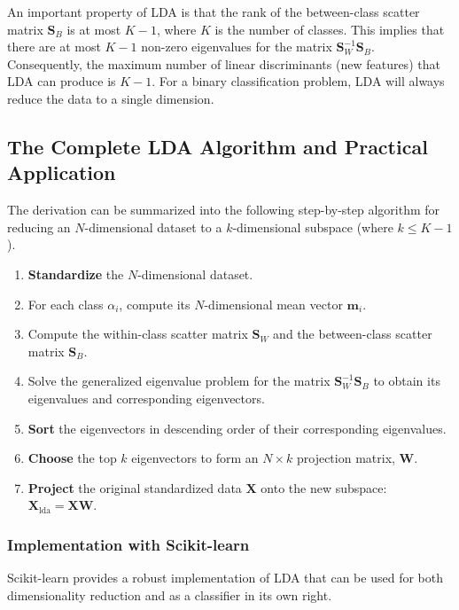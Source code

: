 \begin{enumerate}
\begin{remark}
An important property of LDA is that the rank of the between-class scatter matrix $\mathbf{S}_B$ is at most $K-1$, where $K$ is the number of classes. This implies that there are at most $K-1$ non-zero eigenvalues for the matrix $\mathbf{S}_W^{-1}\mathbf{S}_B$. Consequently, the maximum number of linear discriminants (new features) that LDA can produce is $K-1$. For a binary classification problem, LDA will always reduce the data to a single dimension.
\end{remark}

\subsection{The Complete LDA Algorithm and Practical Application}
The derivation can be summarized into the following step-by-step algorithm for reducing an $N$-dimensional dataset to a $k$-dimensional subspace (where $k \le K-1$).

\begin{enumerate}
    \item \textbf{Standardize} the $N$-dimensional dataset.
    \item For each class $\alpha_i$, compute its $N$-dimensional mean vector $\mathbf{m}_i$.
    \item Compute the within-class scatter matrix $\mathbf{S}_W$ and the between-class scatter matrix $\mathbf{S}_B$.
    \item Solve the generalized eigenvalue problem for the matrix $\mathbf{S}_W^{-1}\mathbf{S}_B$ to obtain its eigenvalues and corresponding eigenvectors.
    \item \textbf{Sort} the eigenvectors in descending order of their corresponding eigenvalues.
    \item \textbf{Choose} the top $k$ eigenvectors to form an $N \times k$ projection matrix, $\mathbf{W}$.
    \item \textbf{Project} the original standardized data $\mathbf{X}$ onto the new subspace: $\mathbf{X}_{\text{lda}} = \mathbf{XW}$.
\end{enumerate}

\subsubsection*{Implementation with Scikit-learn}
Scikit-learn provides a robust implementation of LDA that can be used for both dimensionality reduction and as a classifier in its own right.


\end{enumerate}
